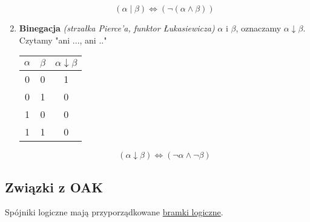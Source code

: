 \documentclass[a5paper,8pt]{article}
\theoremstyle{mythmstyle}
\begin{document}
\begin{enumerate}
                \begin{equation*}
                    (\alpha \mid \beta) \iff (\neg (\alpha \wedge \beta))
                \end{equation*}

                \pagebreak
                \item \textbf{Binegacja} \textit{(strzałka Pierce'a, funktor Łukasiewicza)} $\alpha$ i $\beta$, oznaczamy $\alpha \downarrow \beta$.\\
                Czytamy "ani ..., ani .."\\

                \begin{center}
                    \begin{tabular}{|c|c|c|}
                      \hline 
                      $\alpha$ & $\beta$ & $\alpha \downarrow \beta$\\
                      \hline
                      0 & 0 & 1\\
                      \hline
                      0 & 1 & 0\\
                      \hline
                      1 & 0 & 0\\
                      \hline
                      1 & 1 & 0\\
                      \hline
                    \end{tabular}
                \end{center}

                \begin{equation*}
                    (\alpha \downarrow \beta) \iff (\neg \alpha \wedge \neg \beta)
                \end{equation*}

            \end{enumerate}
            
        \subsection{Związki z OAK} %
        \label{sub:związki_z_oak}
            Spójniki logiczne mają przyporządkowane \underline{bramki logiczne}.
\end{document}
